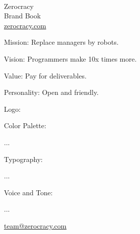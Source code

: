 \documentclass{article}
\date{\today}
\newcommand\slide[1]{%
  \pagebreak\topskip0pt\vspace*{\fill}%
  \begin{center}\Huge%
  #1
  \end{center}%
  \vspace*{\fill}}
\begin{document}
\setlength{\parindent}{0pt} %

\sffamily


\slide{%
  \\
  Zerocracy
  \\[1em]
  \large
  Brand Book\\
  \href{https://www.zerocracy.com}{zerocracy.com}}

\slide{
  Mission: Replace managers by robots.
  \par
  Vision: Programmers make 10x times more.
  \par
  Value: Pay for deliverables.
  \par
  Personality: Open and friendly.}

\slide{
  Logo:
  \par
  }

\slide{
  Color Palette:
  \par
  ...}

\slide{
  Typography:
  \par
  ...}

\slide{
  Voice and Tone:
  \par
  ...}

\slide{%
  \href{mailto:team@zerocracy.com}{team@zerocracy.com}}
\end{document}
